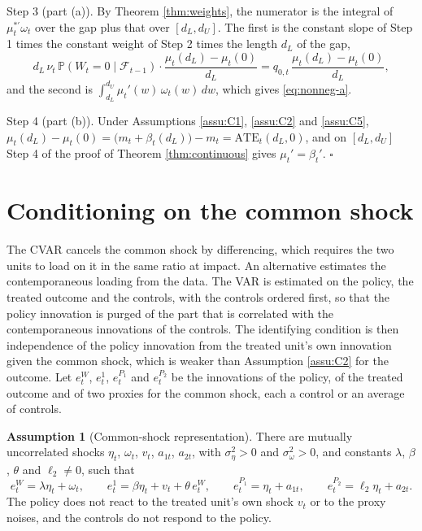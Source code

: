 \documentclass[12pt,a4paper]{article}
\theoremstyle{definition}
\newtheorem{assumption}{Assumption}
\begin{document}
Step 3 (part (a)). By Theorem \ref{thm:weights}, the numerator is the integral of $\mu_t^{\ast\prime}\omega_t$ over the gap plus that over $[d_L,d_U]$. The first is the constant slope of Step 1 times the constant weight of Step 2 times the length $d_L$ of the gap,
\[
d_L\,\nu_t\,\mathbb{P}(W_t=0\mid\mathcal{F}_{t-1})\cdot\frac{\mu_t(d_L)-\mu_t(0)}{d_L}=q_{0,t}\,\frac{\mu_t(d_L)-\mu_t(0)}{d_L},
\]
and the second is $\int_{d_L}^{d_U}\mu_t'(w)\,\omega_t(w)\,dw$, which gives \eqref{eq:nonneg-a}.

Step 4 (part (b)). Under Assumptions \ref{assu:C1}, \ref{assu:C2} and \ref{assu:C5}, $\mu_t(d_L)-\mu_t(0)=\big(m_t+\beta_t(d_L)\big)-m_t=\mathrm{ATE}_t(d_L,0)$, and on $[d_L,d_U]$ Step 4 of the proof of Theorem \ref{thm:continuous} gives $\mu_t'=\beta_t'$. $\square$


\section{Conditioning on the common shock\label{sec:proxy}}

The CVAR cancels the common shock by differencing, which requires the two units to load on it in the same ratio at impact. An alternative estimates the contemporaneous loading from the data. The VAR is estimated on the policy, the treated outcome and the controls, with the controls ordered first, so that the policy innovation is purged of the part that is correlated with the contemporaneous innovations of the controls. The identifying condition is then independence of the policy innovation from the treated unit's own innovation given the common shock, which is weaker than Assumption \ref{assu:C2} for the outcome. Let $e^W_t$, $e^1_t$, $e^{P_1}_t$ and $e^{P_2}_t$ be the innovations of the policy, of the treated outcome and of two proxies for the common shock, each a control or an average of controls.

\begin{assumption}[Common-shock representation\label{assu:P}]
There are mutually uncorrelated shocks $\eta_t$, $\omega_t$, $v_t$, $a_{1t}$, $a_{2t}$, with $\sigma_\eta^2>0$ and $\sigma_\omega^2>0$, and constants $\lambda$, $\beta$, $\theta$ and $\ell_2\neq0$, such that
\begin{equation}
e^W_t=\lambda\eta_t+\omega_t,\qquad e^1_t=\beta\eta_t+v_t+\theta\,e^W_t,\qquad e^{P_1}_t=\eta_t+a_{1t},\qquad e^{P_2}_t=\ell_2\eta_t+a_{2t}.
\label{eq:common-shock}
\end{equation}
The policy does not react to the treated unit's own shock $v_t$ or to the proxy noises, and the controls do not respond to the policy.
\end{assumption}
\end{document}

